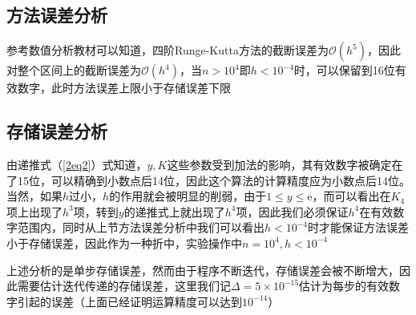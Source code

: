 \documentclass[onecolumn,compsoc]{IEEEtran}
\renewcommand{\|}{\Bigg |}
\newcommand{\e}{\mathrm{e}}
\begin{document}
\subsection{方法误差分析}
参考数值分析教材可以知道，四阶Runge-Kutta方法的截断误差为$\mathcal{O}(h^5)$，因此对整个区间上的截断误差为$\mathcal{O}(h^4)$，当$n >10^4$即$h < 10^{-4}$时，可以保留到16位有效数字，此时方法误差上限小于存储误差下限
\subsection{存储误差分析}
由递推式（\ref{2eq2}）式知道，$y,K$这些参数受到加法的影响，其有效数字被确定在了15位，可以精确到小数点后14位，因此这个算法的计算精度应为小数点后14位。当然，如果$h$过小，$h$的作用就会被明显的削弱，由于$1 \le y \le \e$，而可以看出在$K_4$项上出现了$h^3$项，转到$y$的递推式上就出现了$h^4$项，因此我们必须保证$h^4$在有效数字范围内，同时从上节方法误差分析中我们可以看出$h < 10^{-4}$时才能保证方法误差小于存储误差，因此作为一种折中，实验操作中$n = 10^4,h < 10^{-4}$

上述分析的是单步存储误差，然而由于程序不断迭代，存储误差会被不断增大，因此需要估计迭代传递的存储误差，这里我们记$\Delta =5\times10^{-15}$估计为每步的有效数字引起的误差（上面已经证明运算精度可以达到$10^{-14}$）
\end{document}

